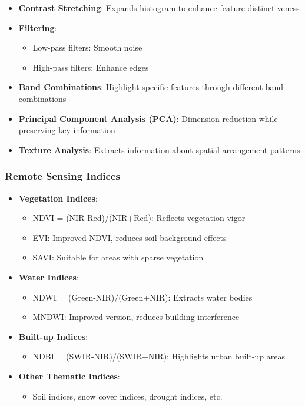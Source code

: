 \documentclass[
  letterpaper,
]{scrbook}
\providecommand{\tightlist}{%
  \setlength{\itemsep}{0pt}\setlength{\parskip}{0pt}}\usepackage{longtable,booktabs,array}
\begin{document}
\begin{itemize}
\tightlist
\item
  \textbf{Contrast Stretching}: Expands histogram to enhance feature
  distinctiveness
\item
  \textbf{Filtering}:

  \begin{itemize}
  \tightlist
  \item
    Low-pass filters: Smooth noise
  \item
    High-pass filters: Enhance edges
  \end{itemize}
\item
  \textbf{Band Combinations}: Highlight specific features through
  different band combinations
\item
  \textbf{Principal Component Analysis (PCA)}: Dimension reduction while
  preserving key information
\item
  \textbf{Texture Analysis}: Extracts information about spatial
  arrangement patterns
\end{itemize}

\subsubsection{Remote Sensing Indices}\label{remote-sensing-indices}

\begin{itemize}
\tightlist
\item
  \textbf{Vegetation Indices}:

  \begin{itemize}
  \tightlist
  \item
    NDVI = (NIR-Red)/(NIR+Red): Reflects vegetation vigor
  \item
    EVI: Improved NDVI, reduces soil background effects
  \item
    SAVI: Suitable for areas with sparse vegetation
  \end{itemize}
\item
  \textbf{Water Indices}:

  \begin{itemize}
  \tightlist
  \item
    NDWI = (Green-NIR)/(Green+NIR): Extracts water bodies
  \item
    MNDWI: Improved version, reduces building interference
  \end{itemize}
\item
  \textbf{Built-up Indices}:

  \begin{itemize}
  \tightlist
  \item
    NDBI = (SWIR-NIR)/(SWIR+NIR): Highlights urban built-up areas
  \end{itemize}
\item
  \textbf{Other Thematic Indices}:

  \begin{itemize}
  \tightlist
  \item
    Soil indices, snow cover indices, drought indices, etc.
  \end{itemize}
\end{itemize}
\end{document}
